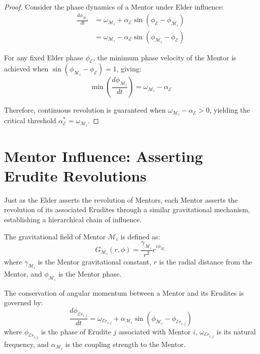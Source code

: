 \begin{proof}
Consider the phase dynamics of a Mentor under Elder influence:
\begin{align}
\frac{d\phi_{\mathcal{M}_i}}{dt} &= \omega_{\mathcal{M}_i} + \alpha_{\mathcal{E}} \sin(\phi_{\mathcal{E}} - \phi_{\mathcal{M}_i})\\
&= \omega_{\mathcal{M}_i} - \alpha_{\mathcal{E}} \sin(\phi_{\mathcal{M}_i} - \phi_{\mathcal{E}})
\end{align}

For any fixed Elder phase $\phi_{\mathcal{E}}$, the minimum phase velocity of the Mentor is achieved when $\sin(\phi_{\mathcal{M}_i} - \phi_{\mathcal{E}}) = 1$, giving:
\begin{equation}
\min\left(\frac{d\phi_{\mathcal{M}_i}}{dt}\right) = \omega_{\mathcal{M}_i} - \alpha_{\mathcal{E}}
\end{equation}

Therefore, continuous revolution is guaranteed when $\omega_{\mathcal{M}_i} - \alpha_{\mathcal{E}} > 0$, yielding the critical threshold $\alpha_{\mathcal{E}}^* = \omega_{\mathcal{M}_i}$.
\end{proof}

\section{Mentor Influence: Asserting Erudite Revolutions}

Just as the Elder asserts the revolution of Mentors, each Mentor asserts the revolution of its associated Erudites through a similar gravitational mechanism, establishing a hierarchical chain of influence.

\begin{definition}
The gravitational field of Mentor $\mathcal{M}_i$ is defined as:
\begin{equation}
G_{\mathcal{M}_i}(r, \phi) = \frac{\gamma_{\mathcal{M}_i}}{r^2}e^{i\phi_{\mathcal{M}_i}}
\end{equation}
where $\gamma_{\mathcal{M}_i}$ is the Mentor gravitational constant, $r$ is the radial distance from the Mentor, and $\phi_{\mathcal{M}_i}$ is the Mentor phase.
\end{definition}

\begin{proposition}
The conservation of angular momentum between a Mentor and its Erudites is governed by:
\begin{equation}
\frac{d\phi_{\mathcal{E}r_{i,j}}}{dt} = \omega_{\mathcal{E}r_{i,j}} + \alpha_{\mathcal{M}_i} \sin(\phi_{\mathcal{M}_i} - \phi_{\mathcal{E}r_{i,j}})
\end{equation}
where $\phi_{\mathcal{E}r_{i,j}}$ is the phase of Erudite $j$ associated with Mentor $i$, $\omega_{\mathcal{E}r_{i,j}}$ is its natural frequency, and $\alpha_{\mathcal{M}_i}$ is the coupling strength to the Mentor.
\end{proposition}

